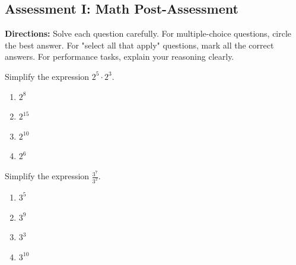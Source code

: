 \documentclass[12pt]{article}
\begin{document}
\subsection*{Assessment I: Math Post-Assessment}
\onehalfspacing

\begin{tcolorbox}[colframe=black!50, colback=white, title=Assessment Directions]
\textbf{Directions:} Solve each question carefully. For multiple-choice questions, circle the best answer. For "select all that apply" questions, mark all the correct answers. For performance tasks, explain your reasoning clearly.
\end{tcolorbox}

\begin{tcolorbox}[colframe=black!50, colback=white, title=\textbf{Problem 1 (8.EE.A.1)}]
Simplify the expression \(2^5 \cdot 2^3\).

\begin{enumerate}[label=(\Alph*)]
    \item \(2^8\)
    \item \(2^{15}\)
    \item \(2^{10}\)
    \item \(2^6\)
\end{enumerate}
\end{tcolorbox}

\begin{tcolorbox}[colframe=black!50, colback=white, title=\textbf{Problem 2 (8.EE.A.1)}]
Simplify the expression \(\frac{3^7}{3^2}\).

\begin{enumerate}[label=(\Alph*)]
    \item \(3^5\)
    \item \(3^9\)
    \item \(3^3\)
    \item \(3^{10}\)
\end{enumerate}
\end{tcolorbox}
\end{document}
